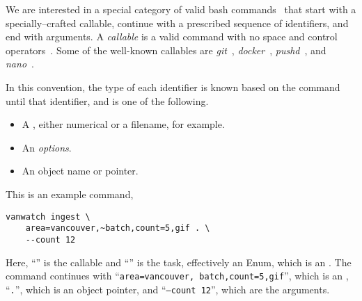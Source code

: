 We are interested in a special category of valid bash commands~\cite{shell_syntax} that start with a specially--crafted callable, continue with a prescribed sequence of identifiers, and end with arguments. 
A \emph{callable} is a valid command with no space and control operators~\cite{control_operators}. Some of the well-known callables are \emph{git}~\cite{git}, \emph{docker}~\cite{docker}, \emph{pushd}~\cite{pushd}, and \emph{nano}~\cite{nano}. 

In this convention, the type of each identifier is known based on the command until that identifier, and is one of the following.
%
\begin{itemize}
    \item A , either numerical or a filename, for example.
    \item An \emph{options}.
    \item An object name or pointer.
\end{itemize}
%
This is an example command,
%
\begin{graybox}
\begin{verbatim}
vanwatch ingest \
    area=vancouver,~batch,count=5,gif . \
    --count 12
\end{verbatim}
\end{graybox}
%
Here, ``'' is the callable and ``'' is the task, effectively an Enum, which is an . The command continues with ``\texttt{area=vancouver,~batch,count=5,gif}'', which is an , ``\texttt{.}'', which is an object pointer, and ``\texttt{--count 12}'', which are the arguments.